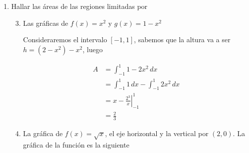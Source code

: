 \documentclass{report}
\begin{document}
\begin{enumerate}[label=\textcolor{NavyBlue}{\textbf{\arabic*.}}]
            \item Hallar las áreas de las regiones limitadas por
            \begin{enumerate}[label=\textcolor{NavyBlue}{\textbf{\roman*.}}]
                \setcounter{enumii}{2}
                \item Las gráficas de $f(x) = x^2$ y $g(x) = 1 - x^2$
                \begin{center}
                \end{center}

                Consideraremos el intervalo $[-1, 1]$, sabemos que la altura va a ser $h = (2-x^2)-x^2$, luego

                \begin{align*}
                    A &= \int_{-1}^{1}1-2x^2\,dx\\
                    &= \int_{-1}^{1}1\,dx - \int_{-1}^{1}2x^2\,dx\\
                    &= \left. x - \frac{2^3}{x} \right|_{-1}^{1}\\
                    &= \frac{2}{3}
                \end{align*}
                \setcounter{enumii}{5}
                \item La gráfica de $f(x) = \sqrt{x}$, el eje horizontal y la vertical por $(2, 0)$.
                La gráfica de la función es la siguiente


\end{enumerate}
\end{enumerate}
\end{document}
